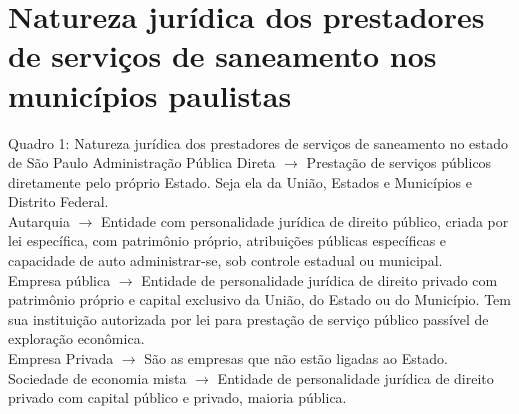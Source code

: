 

\section{Natureza jurídica dos prestadores de serviços de saneamento nos municípios paulistas}\label{s2}


\begin{myexampleblock}{Quadro 1: Natureza jurídica dos prestadores de serviços de saneamento no estado de São Paulo}
   Administração Pública Direta $\rightarrow$ Prestação de serviços
públicos diretamente pelo próprio Estado. Seja ela da União, Estados e Municípios e Distrito Federal. \\
   
   Autarquia  $\rightarrow$ Entidade com personalidade jurídica de direito público, criada por lei específica, com patrimônio próprio, atribuições públicas
específicas e capacidade de auto administrar-se, sob controle estadual ou municipal. \\

Empresa pública $\rightarrow$ Entidade de personalidade jurídica de direito privado com patrimônio próprio e capital exclusivo da União, do Estado ou do
Município. Tem sua instituição autorizada por lei para prestação de serviço público passível de exploração econômica. \\

Empresa Privada $\rightarrow$ São as empresas que não estão ligadas ao Estado. \\

Sociedade de economia mista $\rightarrow$ Entidade de personalidade jurídica de direito privado com capital público e privado, maioria pública. 
\end{myexampleblock}





